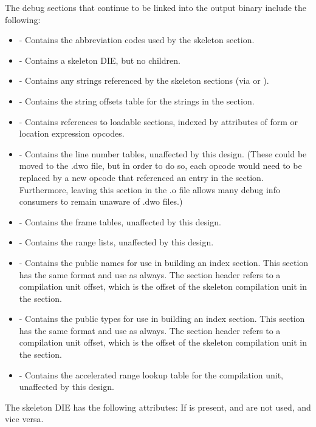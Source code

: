 The debug sections that continue to be linked into the
output binary include the following:
\begin{itemize}
\item
\dotdebugabbrev{} - Contains the abbreviation codes used by the
skeleton \dotdebuginfo{} section.
\item
\dotdebuginfo{} - Contains a skeleton \DWTAGcompileunit{} DIE,
but no children.
\item
\dotdebugstr{} - Contains any strings referenced by the skeleton
\dotdebuginfo{} sections (via \DWFORMstrp{} or \DWFORMstrx{}).
\item
\dotdebugstroffsets{} - Contains the string offsets table for
the strings in the \dotdebugstr{} section.
\item
\dotdebugaddr{} - Contains references to loadable sections,
indexed by attributes of form \DWFORMaddrx{} or location
expression \DWOPaddrx{} opcodes.
\item
\dotdebugline{} - Contains the line number tables, unaffected by
this design. (These could be moved to the .dwo file, but in
order to do so, each \DWLNEsetaddress{} opcode would need to
be replaced by a new opcode that referenced an entry in the
\dotdebugaddr{} section. Furthermore, leaving this section in the
.o file allows many debug info consumers to remain unaware of
.dwo files.)
\item
\dotdebugframe{} - Contains the frame tables, unaffected by this
design.
\item
\dotdebugranges{} - Contains the range lists, unaffected by this
design.
\item
\dotdebugpubnames{} - Contains the public names for use in
building an index section. This section has the same
format and use as always. The section header refers to a
compilation unit offset, which is the offset of the
skeleton compilation unit in the \dotdebuginfo{} section.
\item
\dotdebugpubtypes{} - Contains the public types for use in
building an index section. This section has the same
format and use as always. The section header refers to a
compilation unit offset, which is the offset of the
skeleton compilation unit in the \dotdebuginfo{} section.
\item
\dotdebugaranges{} - Contains the accelerated range lookup table
for the compilation unit, unaffected by this design.
\end{itemize}

The skeleton \DWTAGcompileunit{} DIE has the following attributes:
\dag{} If \DWATranges{} is present, \DWATlowpc{} and \DWAThighpc{} are
not used, and vice versa.

